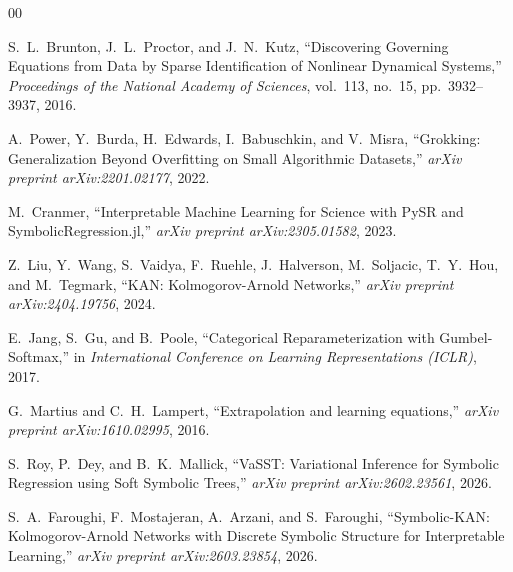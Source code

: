 \documentclass[conference]{IEEEtran}
\begin{document}
\begin{thebibliography}{00}

  S.~L.~Brunton, J.~L.~Proctor, and J.~N.~Kutz, ``Discovering Governing Equations from Data by Sparse Identification of Nonlinear Dynamical Systems,'' \textit{Proceedings of the National Academy of Sciences}, vol.~113, no.~15, pp.~3932--3937, 2016.

  A.~Power, Y.~Burda, H.~Edwards, I.~Babuschkin, and V.~Misra, ``Grokking: Generalization Beyond Overfitting on Small Algorithmic Datasets,'' \textit{arXiv preprint arXiv:2201.02177}, 2022.

  M.~Cranmer, ``Interpretable Machine Learning for Science with PySR and SymbolicRegression.jl,'' \textit{arXiv preprint arXiv:2305.01582}, 2023.

  Z.~Liu, Y.~Wang, S.~Vaidya, F.~Ruehle, J.~Halverson, M.~Soljacic, T.~Y.~Hou, and M.~Tegmark, ``KAN: Kolmogorov-Arnold Networks,'' \textit{arXiv preprint arXiv:2404.19756}, 2024.

  E.~Jang, S.~Gu, and B.~Poole, ``Categorical Reparameterization with Gumbel-Softmax,'' in \textit{International Conference on Learning Representations (ICLR)}, 2017.

  G.~Martius and C.~H.~Lampert, ``Extrapolation and learning equations,'' \textit{arXiv preprint arXiv:1610.02995}, 2016.

  S.~Roy, P.~Dey, and B.~K.~Mallick, ``VaSST: Variational Inference for Symbolic Regression using Soft Symbolic Trees,'' \textit{arXiv preprint arXiv:2602.23561}, 2026.

  S.~A.~Faroughi, F.~Mostajeran, A.~Arzani, and S.~Faroughi, ``Symbolic-KAN: Kolmogorov-Arnold Networks with Discrete Symbolic Structure for Interpretable Learning,'' \textit{arXiv preprint arXiv:2603.23854}, 2026.

\end{thebibliography}
\end{document}
